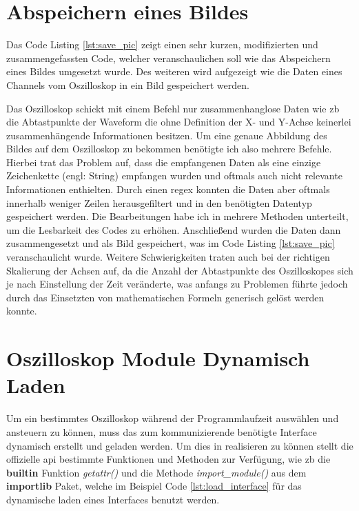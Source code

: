 \section{Abspeichern eines Bildes}
\label{sec:save_pic}

Das Code Listing \ref{lst:save_pic} zeigt einen sehr kurzen, modifizierten und zusammengefassten Code, welcher veranschaulichen soll wie das Abspeichern eines Bildes umgesetzt wurde. Des weiteren wird aufgezeigt wie die Daten eines Channels vom Oszilloskop in ein Bild gespeichert werden.


Das Oszilloskop schickt mit einem Befehl nur zusammenhanglose Daten wie \ac{zb} die Abtastpunkte der Waveform die ohne Definition der X- und Y-Achse keinerlei zusammenhängende Informationen besitzen. Um eine genaue Abbildung des Bildes auf dem Oszilloskop zu bekommen benötigte ich also mehrere Befehle. Hierbei trat das Problem auf, dass die empfangenen Daten als eine einzige Zeichenkette (engl: String) empfangen wurden und oftmals auch nicht relevante Informationen enthielten. Durch einen \ac{regex} konnten die Daten aber oftmals innerhalb weniger Zeilen herausgefiltert und in den benötigten Datentyp gespeichert werden. Die Bearbeitungen habe ich in mehrere Methoden unterteilt, um die Lesbarkeit des Codes zu erhöhen. Anschließend wurden die Daten dann zusammengesetzt und als Bild gespeichert, was im Code Listing \ref{lst:save_pic} veranschaulicht wurde. Weitere Schwierigkeiten traten auch bei der richtigen Skalierung der Achsen auf, da die Anzahl der Abtastpunkte des Oszilloskopes sich je nach Einstellung der Zeit veränderte, was anfangs zu Problemen führte jedoch durch das Einsetzten von mathematischen Formeln generisch gelöst werden konnte. 

\section{Oszilloskop Module Dynamisch Laden}
\label{sec:dynamic_load}

Um ein bestimmtes Oszilloskop während der Programmlaufzeit auswählen und ansteuern zu können, muss das zum kommunizierende benötigte Interface dynamisch erstellt und geladen werden.
Um dies in  realisieren zu können stellt die offizielle \ac{api} bestimmte Funktionen und Methoden zur Verfügung, wie \ac{zb} die \textbf{builtin} Funktion \textit{getattr()} und die Methode \textit{import\_module()} aus dem \textbf{importlib} Paket, welche im Beispiel Code \ref{lst:load_interface} für das dynamische laden eines Interfaces benutzt werden.

